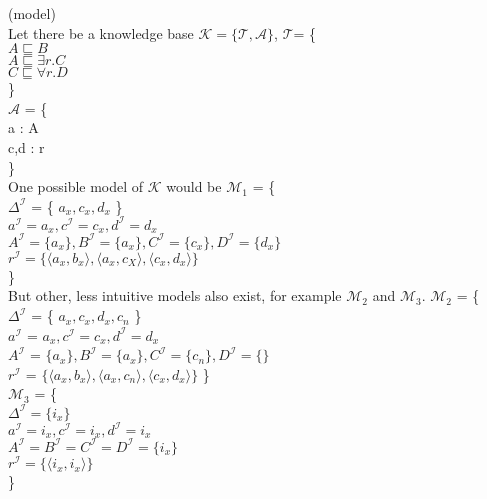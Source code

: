 \begin{myex} (model) \\

\noindent Let there be a knowledge base $\mathcal{K} = \{ \mathcal{T} , \mathcal{A} \}$, 
$ \mathcal{T} $= \{ \\
\indent $A \sqsubseteq B$ \\
\indent $A \sqsubseteq	\exists r.C$ \\
\indent $C \sqsubseteq \forall r.D$\\
\}\\
$ \mathcal{A} $ = \{  \\
\indent a : A \\
\indent c,d : r \\
\} 
\\
One possible model of $\mathcal{K}$ would be $\mathcal{M}_1$ = \{ \\
\indent $\Delta ^\mathcal{I}$ = \{ $a_x, c_x, d_x$ \} \\
\indent $a^\mathcal{I} = a_x, c^\mathcal{I} = c_x, d^\mathcal{I} = d_x$\\
\indent $A^\mathcal{I} = \{a_x\}, B^\mathcal{I} = \{a_x\}, C^\mathcal{I} = \{c_x\}, D^\mathcal{I} = \{d_x\} $\\
\indent $r^\mathcal{I} = \{ \langle a_x,b_x\rangle , \langle a_x,c_X \rangle, \langle c_x,d_x \rangle \} $ \\
  		\} \\
But other, less intuitive models also exist, for example $\mathcal{M}_2$ and $\mathcal{M}_3$.
$\mathcal{M}_2$ = \{  \\
\indent$ \Delta ^\mathcal{I}$ = \{ $a_x, c_x, d_x, c_n$ \} \\ 
\indent$a^\mathcal{I} $ = $a_x, c^\mathcal{I} = c_x, d^\mathcal{I} = d_x$ \\
\indent$A^\mathcal{I}$ = $\{a_x\}, B^\mathcal{I} = \{a_x\}, C^\mathcal{I} = \{c_n\}, D^\mathcal{I} = \{ \} $ \\
\indent$r^\mathcal{I}$ = $\{ \langle a_x,b_x\rangle , \langle a_x,c_n \rangle, \langle c_x,d_x \rangle \} $
\} \\
$\mathcal{M}_3$ = \{ \\
\indent $\Delta ^\mathcal{I} = \{ i_x\}     $\\
 \indent $a^\mathcal{I} = i_x, c^\mathcal{I} = i_x, d^\mathcal{I} = i_x $\\
\indent $A^\mathcal{I} = B^\mathcal{I} = C^\mathcal{I} = D^\mathcal{I} = \{i_x\}$\\
\indent $r^\mathcal{I} = \{ \langle i_x, i_x \rangle \}$\\
\}
\end{myex}

